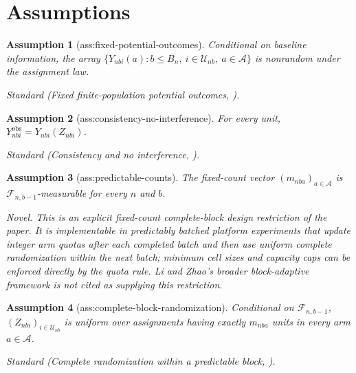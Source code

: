 \documentclass{article}
\newtheorem{assumption}{Assumption}
\begin{document}
\section{Assumptions}

\begin{assumption}[ass:fixed-potential-outcomes]\label{ass:fixed-potential-outcomes}
Conditional on baseline information, the array \(\{Y_{nbi}(a):b\le B_n,\ i\in\mathcal U_{nb},\ a\in\mathcal A\}\) is nonrandom under the assignment law.
\par\smallskip\noindent\emph{Standard} (Fixed finite-population potential outcomes, \cite{LiZhao2026AdaptiveDesignBased}).
\end{assumption}

\begin{assumption}[ass:consistency-no-interference]\label{ass:consistency-no-interference}
For every unit, \(Y_{nbi}^{\mathrm{obs}}=Y_{nbi}(Z_{nbi})\).
\par\smallskip\noindent\emph{Standard} (Consistency and no interference, \cite{LiZhao2026AdaptiveDesignBased}).
\end{assumption}

\begin{assumption}[ass:predictable-counts]\label{ass:predictable-counts}
The fixed-count vector \((m_{nba})_{a\in\mathcal A}\) is \(\mathcal F_{n,b-1}\)-measurable for every \(n\) and \(b\).
\par\smallskip\noindent\emph{Novel.} This is an explicit fixed-count complete-block design restriction of the paper. It is implementable in predictably batched platform experiments that update integer arm quotas after each completed batch and then use uniform complete randomization within the next batch; minimum cell sizes and capacity caps can be enforced directly by the quota rule. Li and Zhao's broader block-adaptive framework is not cited as supplying this restriction.
\end{assumption}

\begin{assumption}[ass:complete-block-randomization]\label{ass:complete-block-randomization}
Conditional on \(\mathcal F_{n,b-1}\), \((Z_{nbi})_{i\in\mathcal U_{nb}}\) is uniform over assignments having exactly \(m_{nba}\) units in every arm \(a\in\mathcal A\).
\par\smallskip\noindent\emph{Standard} (Complete randomization within a predictable block, \cite{AronowGreenLee2014SharpVariance}).
\end{assumption}
\end{document}
